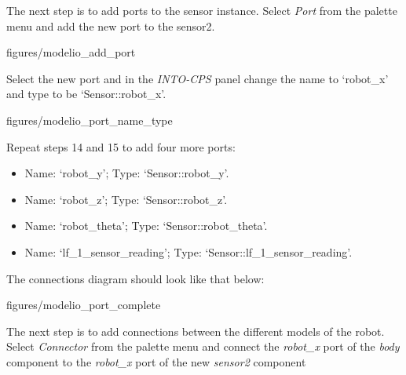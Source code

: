 \documentclass[11pt,a4paper]{../tutorial}
\begin{document}
\begin{instructions}
\newpage

\item The next step is to add ports to the sensor instance. Select \emph{Port} from the palette menu and add the new port to the sensor2.

\begin{annotation}[width=0.7\linewidth,trim=0 500 0 0,clip]{figures/modelio_add_port}
    \end{annotation}



\item Select the new port and in the \emph{INTO-CPS} panel change the name to `robot\_x' and type to be `Sensor::robot\_x'.

\begin{annotation}[width=0.55\linewidth,trim=180 0 0 750,clip]{figures/modelio_port_name_type}
    \end{annotation}

\newpage

\item Repeat steps 14 and 15 to add four more ports:
\begin{itemize}
	\item Name: `robot\_y'; Type: `Sensor::robot\_y'.
	\item Name: `robot\_z'; Type: `Sensor::robot\_z'.
	\item Name: `robot\_theta'; Type: `Sensor::robot\_theta'.
	\item Name: `lf\_1\_sensor\_reading'; Type: `Sensor::lf\_1\_sensor\_reading'.
\end{itemize}
The connections diagram should look like that below:

\begin{annotation}[width=0.7\linewidth,trim=0 400 0 0,clip]{figures/modelio_port_complete}
    \end{annotation}


\item The next step is to add connections between the different models of the robot. Select \emph{Connector} from the palette menu and connect the \emph{robot\_x} port of the \emph{body} component to the \emph{robot\_x} port of the new \emph{sensor2} component


\end{instructions}
\end{document}
